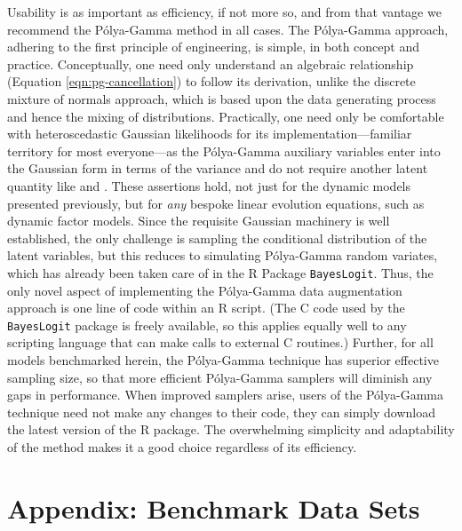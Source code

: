 \documentclass[12pt]{article}
\newcommand{\Polya}{P\'{o}lya}
\begin{document}
Usability is as important as efficiency, if not more so, and from that vantage
we recommend the \Polya-Gamma method in all cases.  The \Polya-Gamma approach,
adhering to the first principle of engineering, is simple, in both concept and
practice.  Conceptually, one need only understand an algebraic relationship
(Equation \ref{eqn:pg-cancellation}) to follow its derivation, unlike the
discrete mixture of normals approach, which is based upon the data generating
process and hence the mixing of distributions.  Practically, one need only be
comfortable with heteroscedastic Gaussian likelihoods for its
implementation---familiar territory for most everyone---as the \Polya-Gamma
auxiliary variables enter into the Gaussian form in terms of the variance and do
not require another latent quantity like \cite{fruhwirth-schnatter-etal-2009}
and \cite{fussl-etal-2013}.  These assertions hold, not just for the dynamic
models presented previously, but for \emph{any} bespoke linear evolution
equations, such as dynamic factor models.  Since the requisite Gaussian
machinery is well established, the only challenge is sampling the conditional
distribution of the latent variables, but this reduces to simulating
\Polya-Gamma random variates, which has already been taken care of in the R
Package \texttt{BayesLogit}.  Thus, the only novel aspect of implementing the
\Polya-Gamma data augmentation approach is one line of code within an R script.
(The C code used by the \texttt{BayesLogit} package is freely available, so this
applies equally well to any scripting language that can make calls to external C
routines.)  Further, for all models benchmarked herein, the \Polya-Gamma
technique has superior effective sampling size, so that more efficient
\Polya-Gamma samplers will diminish any gaps in performance.  When improved
samplers arise, users of the \Polya-Gamma technique need not make any changes to
their code, they can simply download the latest version of the R package.  The
overwhelming simplicity and adaptability of the method makes it a good choice
regardless of its efficiency.

\section*{Appendix: Benchmark Data Sets}
\label{sec:benchmark-details}

\end{document}

